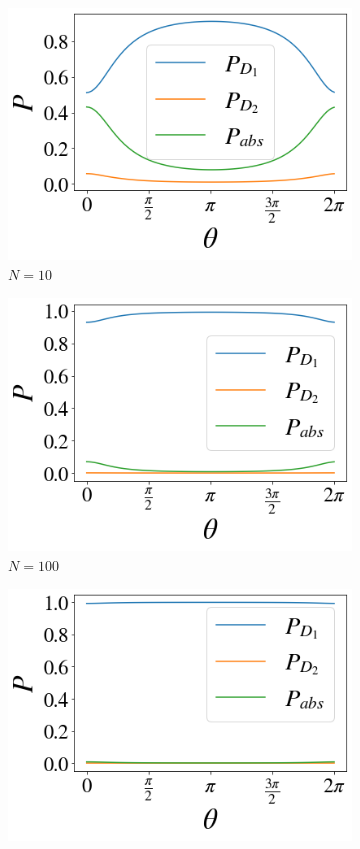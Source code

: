 \documentclass[12pt]{book}
\begin{document}
\begin{figure}[!t]
\begin{subfigure}[b]{0.30\linewidth}
\includegraphics[width=\linewidth]{images/Azuma_phases10.png}
\caption{$N=10$ }
\label{fig:BS1}
\end{subfigure}
\begin{subfigure}[b]{0.30\linewidth}
\includegraphics[width=\linewidth]{images/Azuma_phases100.png}
\caption{$N=100$}
\end{subfigure}
\begin{subfigure}[b]{0.30\linewidth}
\includegraphics[width=\linewidth]{images/Azuma_phases1000.png}

\end{subfigure}
\end{figure}
\end{document}
